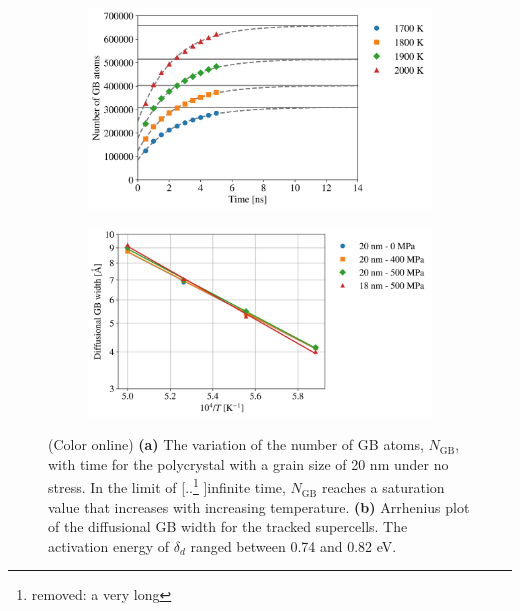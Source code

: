 \documentclass[preprint,12pt,sort&compress]{elsarticle} %
\newcommand{\?}{\stackrel{?}{=}}
\providecommand{\DIFaddtex}[1]{{\sf #1}} %
\providecommand{\DIFdeltex}[1]{{[..\footnote{removed: #1} ]}} %
\providecommand{\DIFaddFL}[1]{\DIFadd{#1}} %
\providecommand{\DIFdelFL}[1]{\DIFdel{#1}} %
\providecommand{\DIFaddbeginFL}{} %
\providecommand{\DIFaddendFL}{} %
\providecommand{\DIFdelbeginFL}{} %
\providecommand{\DIFdelendFL}{} %
\providecommand{\DIFadd}[1]{\texorpdfstring{\DIFaddtex{#1}}{#1}} %
\providecommand{\DIFdel}[1]{\texorpdfstring{\DIFdeltex{#1}}{}} %
\newcommand{\DIFscaledelfig}{0.5}
\newlength{\DIFdelgraphicswidth} %
\newlength{\DIFdelgraphicsheight} %
\newcommand{\DIFaddincludegraphics}[2][]{{\color{blue}\fbox{\DIFOincludegraphics[#1]{#2}}}} %
\newcommand{\DIFdelincludegraphics}[2][]{%
\sbox{\DIFdelgraphicsbox}{\DIFOincludegraphics[#1]{#2}}%
\settoboxwidth{\DIFdelgraphicswidth}{\DIFdelgraphicsbox} %
\settoboxtotalheight{\DIFdelgraphicsheight}{\DIFdelgraphicsbox} %
\scalebox{\DIFscaledelfig}{%
\parbox[b]{\DIFdelgraphicswidth}{\usebox{\DIFdelgraphicsbox}\\[-\baselineskip] \rule{\DIFdelgraphicswidth}{0em}}\llap{\resizebox{\DIFdelgraphicswidth}{\DIFdelgraphicsheight}{%
\setlength{\unitlength}{\DIFdelgraphicswidth}%
\begin{picture}(1,1)%
\thicklines\linethickness{2pt} %
{\color[rgb]{1,0,0}\put(0,0){\framebox(1,1){}}}%
{\color[rgb]{1,0,0}\put(0,0){\line( 1,1){1}}}%
{\color[rgb]{1,0,0}\put(0,1){\line(1,-1){1}}}%
\end{picture}%
}\hspace*{3pt}}} %
} %
\DeclareRobustCommand{\DIFaddbeginFL}{\DIFOaddbeginFL \let\includegraphics\DIFaddincludegraphics} %
\DeclareRobustCommand{\DIFaddendFL}{\DIFOaddendFL \let\includegraphics\DIFOincludegraphics} %
\DeclareRobustCommand{\DIFdelbeginFL}{\DIFOdelbeginFL \let\includegraphics\DIFdelincludegraphics} %
\DeclareRobustCommand{\DIFdelendFL}{\DIFOaddendFL \let\includegraphics\DIFOincludegraphics} %
\begin{document}
\begin{figure}[h!]
\centering
\begin{subfigure}{0.48\textwidth}
    \includegraphics[width=\textwidth]{NGB-20-0.png}
    \caption{}
    \label{Fig:NGB}
\end{subfigure}
\hfill
\begin{subfigure}{0.48\textwidth}
    \includegraphics[width=\textwidth]{Delta.png}
    \caption{}
    \label{Fig:GBWidth}
\end{subfigure}
\caption{(Color online) \textbf{(a)} The variation of the number of GB atoms, $N_\mathrm{GB}$, with time for the polycrystal with a grain size of 20 nm under no stress. In the limit of \DIFdelbeginFL \DIFdelFL{a very long }\DIFdelendFL \DIFaddbeginFL \DIFaddFL{infinite }\DIFaddendFL time, $N_\mathrm{GB}$ reaches a saturation value that increases with increasing temperature. \textbf{(b)} Arrhenius plot of the diffusional GB width for the tracked supercells. The activation energy of $\delta_d$ ranged between 0.74 and 0.82 eV.}
\end{figure}
\end{document}
